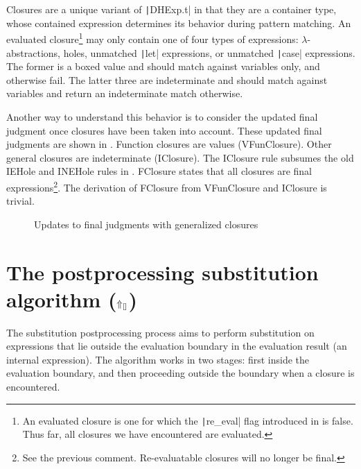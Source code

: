 Closures are a unique variant of \texttt|DHExp.t| in that they are a container type, whose contained expression determines its behavior during pattern matching. An evaluated closure\footnote{An evaluated closure is one for which the \texttt|re_eval| flag introduced in  is false. Thus far, all closures we have encountered are evaluated.} may only contain one of four types of expressions: $\lambda$-abstractions, holes, unmatched \texttt|let| expressions, or unmatched \texttt|case| expressions. The former is a boxed value and should match against variables only, and otherwise fail. The latter three are indeterminate and should match against variables and return an indeterminate match otherwise.

Another way to understand this behavior is to consider the updated \textsf{final} judgment once closures have been taken into account. These updated final judgments are shown in . Function closures are values (VFunClosure). Other general closures are indeterminate (IClosure). The IClosure rule subsumes the old IEHole and INEHole rules in . FClosure states that all closures are final expressions\footnote{See the previous comment. Re-evaluatable closures will no longer be final.}. The derivation of FClosure from VFunClosure and IClosure is trivial.

\begin{figure}
  \centering
  \begin{mdframed}
    \begin{singlespace}
      
    \end{singlespace}
  \end{mdframed}
  \caption{Updates to final judgments with generalized closures}
  \label{fig:update-final-judgment}
\end{figure}

\section{The postprocessing substitution algorithm ($\Uparrow_{[]}$)}
\label{sec:postprocessing-substitution}

The substitution postprocessing process aims to perform substitution on expressions that lie outside the evaluation boundary in the evaluation result (an internal expression). The algorithm works in two stages: first inside the evaluation boundary, and then proceeding outside the boundary when a closure is encountered.

